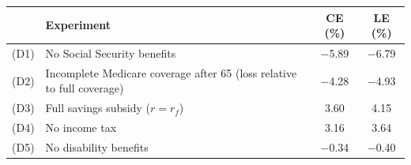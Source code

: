 \begin{tabular}{@{}l l c c@{}}
\toprule
 & Experiment & CE (\%) & LE (\%) \\
\midrule
(D1) & No Social Security benefits & $-$5.89 & $-$6.79 \\
(D2) & Incomplete Medicare coverage after 65 (loss relative to full coverage) & $-$4.28 & $-$4.93 \\
(D3) & Full savings subsidy ($r=r_f$) & 3.60 & 4.15 \\
(D4) & No income tax & 3.16 & 3.64 \\
(D5) & No disability benefits & $-$0.34 & $-$0.40 \\
\bottomrule
\end{tabular}
